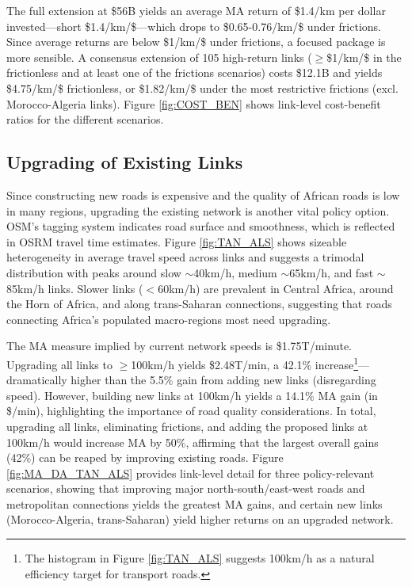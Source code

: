 \documentclass[a4paper]{article}
\begin{document}
The full extension at \$56B yields an average MA return of \$1.4/km per dollar invested---short \$1.4/km/\$---which drops to \$0.65-0.76/km/\$ under frictions. Since average returns are below \$1/km/\$ under frictions, a focused package is more sensible. A consensus extension of 105 high-return links ($\geq$\$1/km/\$ in the frictionless and at least one of the frictions scenarios) costs \$12.1B and yields \$4.75/km/\$ frictionless, or \$1.82/km/\$ under the most restrictive frictions (excl. Morocco-Algeria links). Figure \ref{fig:COST_BEN} shows link-level cost-benefit ratios for the different scenarios. 
  
  
\subsection{Upgrading of Existing Links}  \label{sec:UUEL}

Since constructing new roads is expensive and the quality of African roads is low in many regions, upgrading the existing network is another vital policy option. OSM's tagging system indicates road surface and smoothness, which is reflected in OSRM travel time estimates. Figure \ref{fig:TAN_ALS} shows sizeable heterogeneity in average travel speed across links and suggests a trimodal distribution with peaks around slow $\sim$40km/h, medium $\sim$65km/h, and fast $\sim$85km/h links. Slower links ($<$60km/h) are prevalent in Central Africa, around the Horn of Africa, and along trans-Saharan connections, suggesting that roads connecting Africa's populated macro-regions most need upgrading.\newline 

The MA measure implied by current network speeds is \$1.75T/minute. Upgrading all links to $\geq$100km/h yields \$2.48T/min, a 42.1\% increase\footnote{The histogram in Figure \ref{fig:TAN_ALS} suggests 100km/h as a natural efficiency target for transport roads. \vspace{-2mm}}---dramatically higher than the 5.5\% gain from adding new links (disregarding speed). However, building new links at 100km/h yields a 14.1\% MA gain (in \$/min), highlighting the importance of road quality considerations. In total, upgrading all links, eliminating frictions, and adding the proposed links at 100km/h would increase MA by 50\%, affirming that the largest overall gains (42\%) can be reaped by improving existing roads. Figure \ref{fig:MA_DA_TAN_ALS} provides link-level detail for three policy-relevant scenarios, showing that improving major north-south/east-west roads and metropolitan connections yields the greatest MA gains, and certain new links (Morocco-Algeria, trans-Saharan) yield higher returns on an upgraded network.\newline 
\end{document}
